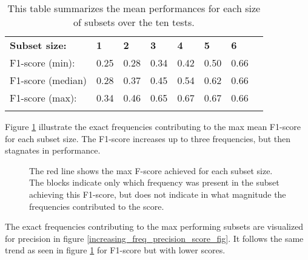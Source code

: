 \begin{longtable}{llllllll}
\caption[Summary exhaustive search]{This table summarizes the mean performances for each size of subsets over the ten tests. }\\
                  &      &      &      &      &      &      &  \\ \hline
\endfirsthead
%
\endhead
%
\hline
\endfoot
%
\endlastfoot
%
\textbf{Subset size:}      & \textbf{1}    & \textbf{2}    & \textbf{3}    & \textbf{4}    & \textbf{5}    & \textbf{6}    &  \\ \hline
F1-score (min):   & 0.25 & 0.28 & 0.34 & 0.42 & 0.50 & 0.66 &  \\
F1-score (median) & 0.28 & 0.37 & 0.45 & 0.54 & 0.62 & 0.66 &  \\
F1-score (max):   & 0.34 & 0.46 & 0.65 & 0.67 & 0.67 & 0.66 &  \\ \hline
\label{summary_per_subset_size_table}

\end{longtable}

Figure \ref{increasing_freq_f1_score_fig} illustrate the exact frequencies contributing to the max mean F1-score for each subset size. The F1-score increases up to three frequencies, but then stagnates in performance.

        \begin{figure}[H]
            \centering
            
            \caption[Best frequency combination - F1-score]{The red line shows the max F-score achieved for each subset size. The blocks indicate only which frequency was present in the subset achieving this F1-score, but does not indicate in what magnitude the frequencies contributed to the score.}
          	\medskip 
            \label{increasing_freq_f1_score_fig}
        \end{figure}

    The exact frequencies contributing to the max performing subsets are visualized for precision in figure \ref{increasing_freq_precision_score_fig}. It follows the same trend as seen in figure \ref{increasing_freq_f1_score_fig} for F1-score but with lower scores.

